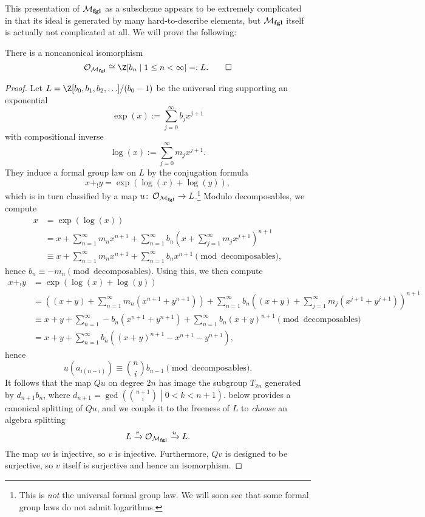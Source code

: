 This presentation of $\mathcal{M}_{\mathbf{fgl}}$ as a subscheme appears to be extremely complicated in that its ideal is generated by many hard-to-describe elements, but $\mathcal{M}_{\mathbf{fgl}}$ itself is actually not complicated at all.  We will prove the following:
\begin{theorem}\label{LazardsTheorem}
There is a noncanonical isomorphism \[\sheaf{O}_{\moduli{fgl}} \cong \Z[b_n \mid 1 \le n < \infty] =: L. \qed\]
\end{theorem}
\begin{proof}
Let $L = \Z[b_0, b_1, b_2, \ldots] / (b_0 - 1)$ be the universal ring supporting an exponential \[\exp(x) := \sum_{j=0}^\infty b_j x^{j+1}\] with compositional inverse \[\log(x) := \sum_{j=0}^\infty m_j x^{j+1}.\]  They induce a formal group law on $L$ by the conjugation formula \[x +_! y = \exp(\log(x) + \log(y)),\] which is in turn classified by a map $u\colon\thinspace \mathcal{O}_{\mathcal{M}_{\mathbf{fgl}}} \to L$.\footnote{This is \emph{not} the universal formal group law.  We will soon see that some formal group laws do not admit logarithms.}  Modulo decomposables, we compute
\begin{align*}
x & = \exp(\log(x)) \\
& = x + \sum_{n=1}^\infty m_n x^{n+1} + \sum_{n=1}^\infty b_n \left( x + \sum_{j=1}^\infty m_j x^{j+1} \right)^{n+1} \\
& \equiv x + \sum_{n=1}^\infty m_n x^{n+1} + \sum_{n=1}^\infty b_n x^{n+1} \pmod{\text{decomposables}},
\end{align*}
hence $b_n \equiv -m_n \pmod{\text{decomposables}}$.  Using this, we then compute
\begin{align*}
x +_! y & = \exp(\log(x) + \log(y)) \\
& = \left( (x + y) + \sum_{n=1}^\infty m_n (x^{n+1} + y^{n+1}) \right) + \sum_{n=1}^\infty b_n \left( (x + y) + \sum_{j=1}^\infty m_j (x^{j+1} + y^{j+1}) \right)^{n+1} \\
& \equiv x + y + \sum_{n=1}^\infty -b_n (x^{n+1} + y^{n+1}) + \sum_{n=1}^\infty b_n (x+y)^{n+1} \pmod{\text{decomposables}} \\
& = x + y + \sum_{n=1}^\infty b_n ((x+y)^{n+1} - x^{n+1} - y^{n+1}),
\end{align*}
hence \[u(a_{i(n-i)}) \equiv \binom{n}{i} b_{n-1} \pmod{\text{decomposables}}.\]  It follows that the map $Qu$ on degree $2n$ has image the subgroup $T_{2n}$ generated by $d_{n+1} b_n$, where $d_{n+1} = \gcd\left( \binom{n+1}{i} \middle| 0 < k < n + 1 \right)$.   below provides a canonical splitting of $Qu$, and we couple it to the freeness of $L$ to \emph{choose} an algebra splitting \[L \xrightarrow{v} \mathcal{O}_{\mathcal{M}_{\mathbf{fgl}}} \xrightarrow{u} L.\]  The map $uv$ is injective, so $v$ is injective.  Furthermore, $Qv$ is designed to be surjective, so $v$ itself is surjective and hence an isomorphism.
\end{proof}

